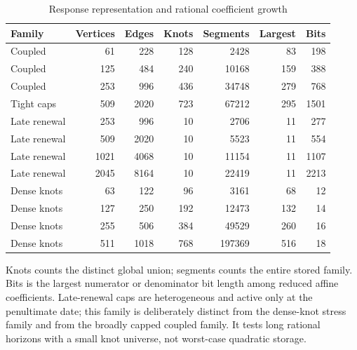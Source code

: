 \begin{table}[htbp]
\centering\small
\caption{Response representation and rational coefficient growth}\label{tab:representation}
\begin{tabular}{lrrrrrr}
\toprule
Family & Vertices & Edges & Knots & Segments & Largest & Bits \\
\midrule
Coupled & 61 & 228 & 128 & 2428 & 83 & 198 \\
Coupled & 125 & 484 & 240 & 10168 & 159 & 388 \\
Coupled & 253 & 996 & 436 & 34748 & 279 & 768 \\
Tight caps & 509 & 2020 & 723 & 67212 & 295 & 1501 \\
Late renewal & 253 & 996 & 10 & 2706 & 11 & 277 \\
Late renewal & 509 & 2020 & 10 & 5523 & 11 & 554 \\
Late renewal & 1021 & 4068 & 10 & 11154 & 11 & 1107 \\
Late renewal & 2045 & 8164 & 10 & 22419 & 11 & 2213 \\
Dense knots & 63 & 122 & 96 & 3161 & 68 & 12 \\
Dense knots & 127 & 250 & 192 & 12473 & 132 & 14 \\
Dense knots & 255 & 506 & 384 & 49529 & 260 & 16 \\
Dense knots & 511 & 1018 & 768 & 197369 & 516 & 18 \\
\bottomrule
\end{tabular}
\par\smallskip\begin{minipage}{\textwidth}\footnotesize Knots counts the distinct global union; segments counts the entire stored family. Bits is the largest numerator or denominator bit length among reduced affine coefficients. Late-renewal caps are heterogeneous and active only at the penultimate date; this family is deliberately distinct from the dense-knot stress family and from the broadly capped coupled family. It tests long rational horizons with a small knot universe, not worst-case quadratic storage.\end{minipage}
\end{table}
\clearpage
